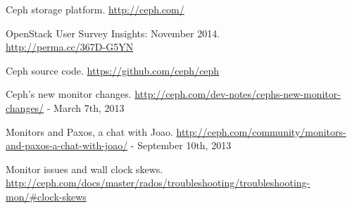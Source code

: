 \documentclass{article}
\begin{document}
\begin{thebibliography}{1}

   Ceph storage platform. \url{http://ceph.com/} 

   OpenStack User Survey Insights: November 2014. \\
  \url{http://perma.cc/367D-G5YN} 
  
   Ceph source code. \url{https://github.com/ceph/ceph} 
  
   Ceph's new monitor changes. \url{http://ceph.com/dev-notes/cephs-new-monitor-changes/} - March 7th, 2013
  
   Monitors and Paxos, a chat with Joao. 
    \url{http://ceph.com/community/monitors-and-paxos-a-chat-with-joao/} - September 10th, 2013
  
   Monitor issues and wall clock skews. 
  \url{http://ceph.com/docs/master/rados/troubleshooting/troubleshooting-mon/#clock-skews}


\end{thebibliography}
	
\end{document}
